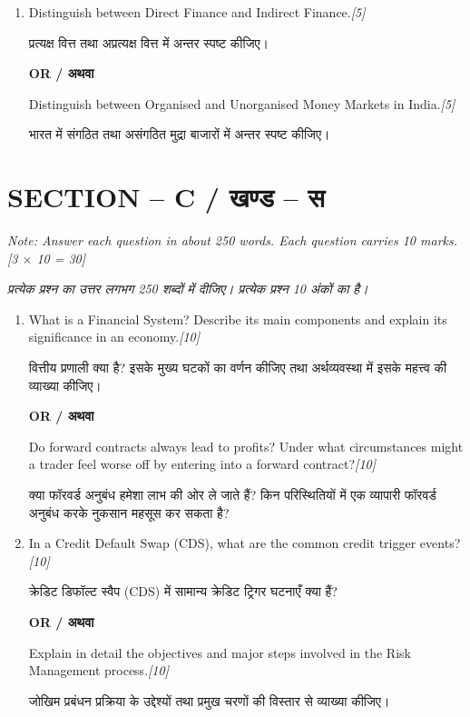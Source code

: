\documentclass[11pt,a4paper]{article}
\newcommand{\pts}[1]{\hfill \textit{[#1]}}
\begin{document}
\begin{enumerate}[label=\textbf{\arabic*.},leftmargin=*,start=2,itemsep=12pt]
  \item Distinguish between Direct Finance and Indirect Finance.\pts{5}
  
  प्रत्यक्ष वित्त तथा अप्रत्यक्ष वित्त में अन्तर स्पष्ट कीजिए।

  \begin{center}\textbf{OR / अथवा}\end{center}

  Distinguish between Organised and Unorganised Money Markets in India.\pts{5}
  
  भारत में संगठित तथा असंगठित मुद्रा बाजारों में अन्तर स्पष्ट कीजिए।

\end{enumerate}

\bigskip

\section*{SECTION -- C / खण्ड -- स}
\noindent \textit{Note: Answer each question in about 250 words. Each question carries 10 marks.}\pts{3 $\times$ 10 = 30}

\noindent \textit{प्रत्येक प्रश्न का उत्तर लगभग 250 शब्दों में दीजिए। प्रत्येक प्रश्न 10 अंकों का है।}

\begin{enumerate}[label=\textbf{\arabic*.},leftmargin=*,start=6,itemsep=14pt]

  \item What is a Financial System? Describe its main components and explain its significance in an economy.\pts{10}
  
  वित्तीय प्रणाली क्या है? इसके मुख्य घटकों का वर्णन कीजिए तथा अर्थव्यवस्था में इसके महत्त्व की व्याख्या कीजिए।

  \begin{center}\textbf{OR / अथवा}\end{center}

  Do forward contracts always lead to profits? Under what circumstances might a trader feel worse off by entering into a forward contract?\pts{10}
  
  क्या फॉरवर्ड अनुबंध हमेशा लाभ की ओर ले जाते हैं? किन परिस्थितियों में एक व्यापारी फॉरवर्ड अनुबंध करके नुकसान महसूस कर सकता है?

  \item In a Credit Default Swap (CDS), what are the common credit trigger events?\pts{10}
  
  क्रेडिट डिफॉल्ट स्वैप (CDS) में सामान्य क्रेडिट ट्रिगर घटनाएँ क्या हैं?

  \begin{center}\textbf{OR / अथवा}\end{center}

  Explain in detail the objectives and major steps involved in the Risk Management process.\pts{10}
  
  जोखिम प्रबंधन प्रक्रिया के उद्देश्यों तथा प्रमुख चरणों की विस्तार से व्याख्या कीजिए।

\end{enumerate}
\end{document}
